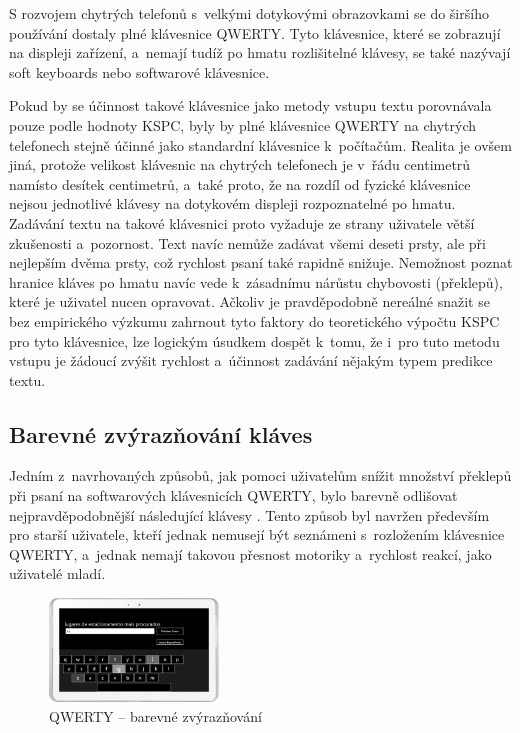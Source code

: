 \documentclass[a4paper,11pt,openany]{book} %
\begin{document}
S rozvojem chytrých telefonů s~velkými dotykovými obrazovkami se do širšího používání dostaly plné klávesnice QWERTY. Tyto klávesnice, které se zobrazují na displeji zařízení, a~nemají tudíž po hmatu rozlišitelné klávesy, se také nazývají soft keyboards nebo softwarové klávesnice.

Pokud by se účinnost takové klávesnice jako metody vstupu textu porovnávala pouze podle hodnoty KSPC, byly by plné klávesnice QWERTY na chytrých telefonech stejně účinné jako standardní klávesnice k~počítačům. Realita je ovšem jiná, protože velikost klávesnic na chytrých telefonech je v~řádu centimetrů namísto desítek centimetrů, a~také proto, že na rozdíl od fyzické klávesnice nejsou jednotlivé klávesy na dotykovém displeji rozpoznatelné po hmatu. Zadávání textu na takové klávesnici proto vyžaduje ze strany uživatele větší zkušenosti a~pozornost. Text navíc nemůže zadávat všemi deseti prsty, ale při nejlepším dvěma prsty, což rychlost psaní také rapidně snižuje. Nemožnost poznat hranice kláves po hmatu navíc vede k~zásadnímu nárůstu chybovosti (překlepů), které je uživatel nucen opravovat. Ačkoliv je pravděpodobně nereálné snažit se bez empirického výzkumu zahrnout tyto faktory do teoretického výpočtu KSPC pro tyto klávesnice, lze logickým úsudkem dospět k~tomu, že i~pro tuto metodu vstupu je žádoucí zvýšit rychlost a~účinnost zadávání nějakým typem predikce textu.

\subsection{Barevné zvýrazňování kláves}

Jedním z~navrhovaných způsobů, jak pomoci uživatelům snížit množství překlepů při psaní na softwarových klávesnicích QWERTY, bylo barevně odlišovat nejpravděpodobnější následující klávesy \parencite{danielgoncalves}. %
Tento způsob byl navržen především pro starší uživatele, kteří jednak nemusejí být seznámeni s~rozložením klávesnice QWERTY, a~jednak nemají takovou přesnost motoriky a~rychlost reakcí, jako uživatelé mladí. 

\begin{figure}[ht]
	\centering
	\includegraphics[width=0.4\textwidth]{qwerty_color}
	\caption{QWERTY -- barevné zvýrazňování}
	\label{fig:qwerty-color}
\end{figure}
\end{document}
